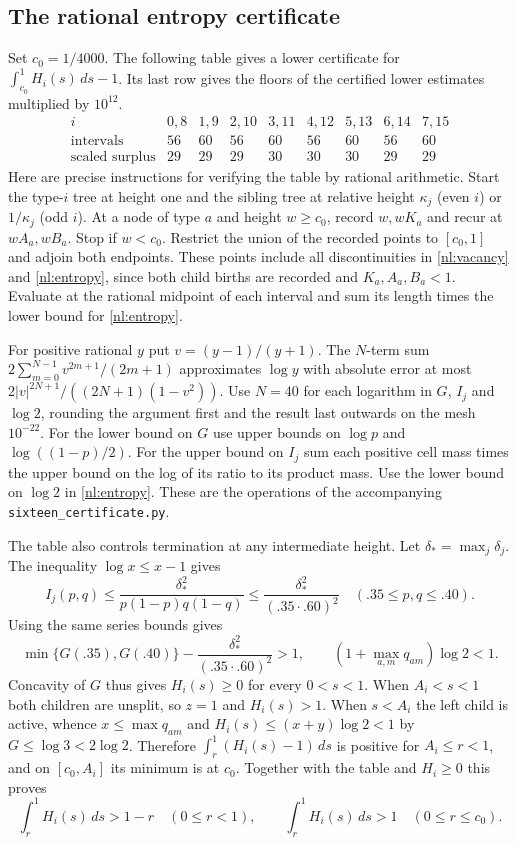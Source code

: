 \documentclass[11pt]{article}
\numberwithin{equation}{section}
\begin{document}
\subsection{The rational entropy certificate}

Set $c_0=1/4000$. The following table gives a lower certificate for
$\int_{c_0}^1 H_i(s)\,ds-1$. Its last row gives the floors of the
certified lower estimates multiplied by $10^{12}$.
\[
\begin{array}{c|rrrrrrrr}
i&0,8&1,9&2,10&3,11&4,12&5,13&6,14&7,15\\ \hline
\text{intervals}&56&60&56&60&56&60&56&60\\
\text{scaled surplus}&29&29&29&30&30&30&29&29
\end{array}
\]
Here are precise instructions for verifying the table by rational
arithmetic. Start the type-$i$ tree at height one and the sibling
tree at relative height $\kappa_j$ (even $i$) or $1/\kappa_j$ (odd
$i$). At a node of type $a$ and height $w\ge c_0$, record $w,wK_a$
and recur at $wA_a,wB_a$. Stop if $w<c_0$. Restrict the union of
the recorded points to $[c_0,1]$ and adjoin both endpoints. These
points include all discontinuities in \eqref{nl:vacancy} and
\eqref{nl:entropy}, since both child births are recorded and
$K_a,A_a,B_a<1$. Evaluate at the rational midpoint of each interval
and sum its length times the lower bound for \eqref{nl:entropy}.

For positive rational $y$ put $v=(y-1)/(y+1)$. The $N$-term
sum $2\sum_{m=0}^{N-1}v^{2m+1}/(2m+1)$ approximates $\log y$ with
absolute error at most
$2|v|^{2N+1}/((2N+1)(1-v^2))$. Use $N=40$ for each logarithm
in $G$, $I_j$ and $\log2$, rounding the argument first and the
result last outwards on the mesh $10^{-22}$. For the lower bound
on $G$ use upper bounds on $\log p$ and $\log((1-p)/2)$.
For the upper bound on $I_j$ sum each positive cell mass times
the upper bound on the log of its ratio to its product mass.
Use the lower bound on $\log2$ in \eqref{nl:entropy}. These are the
operations of the accompanying \texttt{sixteen\_certificate.py}.

The table also controls termination at any intermediate height.
Let $\delta_* =\max_j\delta_j$. The inequality $\log x\le x-1$
gives
\[
 I_j(p,q)\le \frac{\delta_*^2}{p(1-p)q(1-q)}
          \le \frac{\delta_*^2}{(.35\cdot .60)^2}
 \quad(.35\le p,q\le .40).
\]
Using the same series bounds gives
\[
 \min\{G(.35),G(.40)\}-\frac{\delta_*^2}{(.35\cdot .60)^2}>1,
 \qquad (1+\max_{a,m}q_{am})\log2<1.
\]
Concavity of $G$ thus gives $H_i(s)\ge0$ for every $0<s<1$.
When $A_i<s<1$ both children are unsplit, so $z=1$ and $H_i(s)>1$.
When $s<A_i$ the left child is active, whence $x\le\max q_{am}$
and $H_i(s)\le(x+y)\log2<1$ by $G\le\log3<2\log2$.
Therefore $\int_r^1(H_i(s)-1)\,ds$ is positive for $A_i\le r<1$,
and on $[c_0,A_i]$ its minimum is at $c_0$. Together with the
table and $H_i\ge0$ this proves
\begin{equation}
 \int_r^1 H_i(s)\,ds>1-r\quad(0\le r<1),\qquad
 \int_r^1 H_i(s)\,ds>1\quad(0\le r\le c_0).
 \label{nl:budget}
\end{equation}
\end{document}
